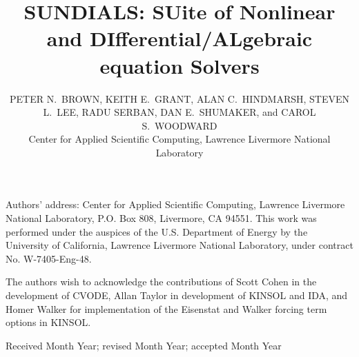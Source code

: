 \documentclass[acmtoms]{acmtrans2m}
\title{SUNDIALS: SUite of Nonlinear and DIfferential/ALgebraic equation Solvers}
\author{PETER N.~BROWN, KEITH E.~GRANT, ALAN C.~HINDMARSH, 
  STEVEN L.~LEE, RADU SERBAN, DAN E.~SHUMAKER, and CAROL S.~WOODWARD \\
  Center for Applied Scientific Computing,
  Lawrence Livermore National Laboratory}
\begin{document}
\setcounter{page}{1}

\begin{bottomstuff}
Authors' address: Center for Applied Scientific Computing, 
Lawrence Livermore National Laboratory, P.O. Box 808,
Livermore, CA 94551.\newline
This work was performed under the auspices of the
U.S. Department of Energy by the University of California,
Lawrence Livermore National Laboratory, under contract No.
W-7405-Eng-48.
\end{bottomstuff}

\maketitle




   
   
   









\begin{acks}
The authors wish to acknowledge the contributions of Scott Cohen
in the development of CVODE, Allan Taylor in development of
KINSOL and IDA, and Homer Walker for implementation of the
Eisenstat and Walker forcing term options in KINSOL.

\end{acks}





\begin{received}
Received Month Year;
revised Month Year; accepted Month Year
\end{received}
\end{document}
